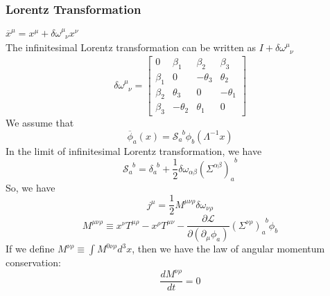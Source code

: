 \subsubsection{Lorentz Transformation}
$\overline{x}^{\mu} = x^{\mu} + \delta \omega^{\mu}_{\phantom{\mu}\nu} x^{\nu}$\\
The infinitesimal Lorentz transformation can be written as $I+\delta \omega^{\mu}_{\phantom{\mu}\nu}$
\[\delta \omega^{\mu}_{\phantom{\mu}\nu} = \left[ 
\begin{matrix} 
0       & \beta_1   & \beta_2   & \beta_3   \\ 
\beta_1 & 0         & -\theta_3 & \theta_2  \\
\beta_2 & \theta_3  & 0         & -\theta_1 \\
\beta_3 & -\theta_2 & \theta_1  & 0
\end{matrix} 
\right]\]
We assume that
\[\overline{\phi}_a(x) = \mathcal{S}_{a}^{\phantom{a}b}\phi_b(\Lambda^{-1}x)\]
In the limit of infinitesimal Lorentz transformation, we have
\[\mathcal{S}_{a}^{\phantom{a}b} = \delta_{a}^{\phantom{a}b}+\frac{1}{2} \delta \omega_{\alpha \beta} (\Sigma^{\alpha \beta})_{a}^{\phantom{a}b} \]
So, we have
\[j^{\mu} = \frac{1}{2} M^{\mu \nu \rho}  \delta \omega_{\nu \rho}\]
\[M^{\mu \nu \rho} \equiv x^{\nu}T^{\mu \rho} - x^{\rho} T^{\mu \nu} - \frac{\partial \mathcal{L}}{\partial (\partial_{\mu}\phi_a)}(\Sigma^{\nu \rho})_{a}^{\phantom{a}b}\phi_b\]
If we define $M^{\nu \rho} \equiv \int M^{0 \nu \rho} d^3 x$, then we have the law of angular momentum conservation:
\[\frac{dM^{\nu \rho}}{dt} = 0\]

